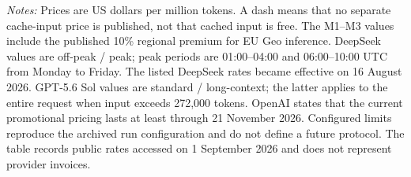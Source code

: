 \begin{landscape}
\noindent\emph{Notes:} Prices are US dollars per million tokens. A dash means
that no separate cache-input price is published, not that cached input is
free. The M1--M3 values include the published 10\% regional premium for EU Geo
inference. DeepSeek values are off-peak / peak; peak periods are
01:00--04:00 and 06:00--10:00 UTC from Monday to Friday. The listed DeepSeek
rates became effective on 16 August 2026. GPT-5.6 Sol values are
standard / long-context; the latter applies to the entire request when input
exceeds 272,000 tokens. OpenAI states that the current promotional pricing
lasts at least through 21 November 2026. Configured limits reproduce the
archived run configuration and do not define a future protocol. The table
records public rates accessed on 1 September 2026 and does not represent
provider invoices.
\endgroup
\end{landscape}

\clearpage
\begingroup
\small
\renewcommand{\arraystretch}{1.18}
\setlength{\tabcolsep}{4pt}

